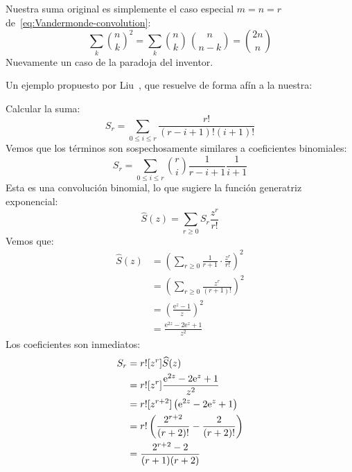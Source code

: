 \begin{example}
    Nuestra suma original
    es simplemente el caso especial \(m = n = r\)
    de~\eqref{eq:Vandermonde-convolution}:
    \begin{equation}
      \label{eq:sum-square-binom}
      \sum_k \binom{n}{k}^2
	= \sum_k \binom{n}{k} \, \binom{n}{n - k}
	= \binom{2 n}{n}
    \end{equation}
    Nuevamente un caso de la paradoja del inventor.%
  \end{example}
  Un ejemplo propuesto por Liu~\cite{liu68:_introd_combin_mathem},
  que resuelve de forma afín a la nuestra:
  \begin{example}
    Calcular la suma:
    \begin{equation}
      \label{eq:so:binomial-convolution}
      S_r
	= \sum_{0 \le i \le r} \frac{r!}{(r - i + 1)! (i + 1)!}
    \end{equation}
    Vemos que los términos son sospechosamente similares
    a coeficientes binomiales:
    \begin{equation*}
      S_r
	= \sum_{0 \le i \le r}
	    \binom{r}{i} \frac{1}{r - i + 1} \frac{1}{i + 1}
    \end{equation*}
    Esta es una convolución binomial,%
    lo que sugiere la función generatriz exponencial:%
    \begin{equation}
      \label{eq:so:binomial-convolution:egf}
      \widehat{S}(z)
	= \sum_{r \ge 0} S_r \frac{z^r}{r!}
    \end{equation}
    Vemos que:
    \begin{align*}
      \widehat{S}(z)
	&= \left(
	     \sum_{r \ge 0} \frac{1}{r + 1} \cdot \frac{z^r}{r!}
	   \right)^2 \\
	&= \left(
	     \sum_{r \ge 0} \frac{z^r}{(r + 1)!}
	   \right)^2 \\
	&= \left(
	     \frac{\mathrm{e}^z - 1}{z}
	   \right)^2 \\
	&= \frac{\mathrm{e}^{2 z} - 2 \mathrm{e}^z + 1}{z^2}
    \end{align*}
    Los coeficientes son inmediatos:
    \begin{align}
      S_r
	&= r! [z^r] \widehat{S}(z) \notag \\
	&= r! [z^r]
	   \frac{\mathrm{e}^{2 z} - 2 \mathrm{e}^z + 1}
		{z^2} \notag \\
	&= r! [z^{r + 2}]
	     \left(\mathrm{e}^{2 z} - 2 \mathrm{e}^z + 1 \right)
		 \notag \\
	&= r! \left(
		\frac{2^{r + 2}}{(r + 2)!}
		  - \frac{2}{(r + 2)!}
	      \right) \notag \\
	&= \frac{2^{r + 2} - 2}{(r + 1) (r + 2)}
	     \label{eq:so:binomial-convolution:coef}
    \end{align}
  \end{example}
